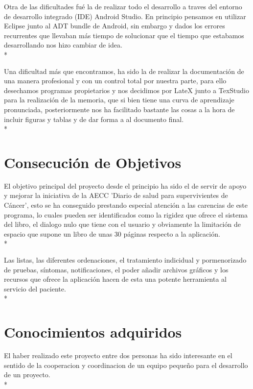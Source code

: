 \documentclass[../pfc.tex]{subfiles}
\begin{document}
	Otra de las dificultades fué la de realizar todo el desarrollo a traves del entorno de desarrollo integrado (IDE) Android Studio. En principio pensamos en utilizar Eclipse junto al ADT bundle de Android, sin embargo y dados los errores recurrentes que llevaban más tiempo de solucionar que el tiempo que estabamos desarrollando nos hizo cambiar de idea.\\*
	 
	Una dificultad más que encontramos, ha sido la de realizar la documentación de una manera profesional y con un control total por nuestra parte, para ello desechamos programas propietarios y nos decidimos por LateX\cite{sharelatex} junto a TexStudio\cite{texstudio} para la realización de la memoria, que si bien tiene una curva de aprendizaje pronunciada, posteriormente nos ha facilitado bastante las cosas a la hora de incluir figuras y tablas y de dar forma a al documento final.\\*
	
		
	\section{Consecución de Objetivos}
	
	El objetivo principal del proyecto desde el principio ha sido el de servir de apoyo y mejorar la iniciativa de la AECC 'Diario de salud para supervivientes de Cáncer', esto se ha conseguido prestando especial atención a las carencias de este programa, lo cuales pueden ser identificados como la rigidez que ofrece el sistema del libro, el dialogo nulo que tiene con el usuario y obviamente la limitación de espacio que supone un libro de unas 30 páginas respecto a la aplicación.\\*
	
	Las listas, las diferentes ordenaciones, el tratamiento indicidual y pormenorizado de pruebas, síntomas, notificaciones, el poder añadir archivos gráficos y los recursos que ofrece la aplicación hacen de esta una potente herramienta al servicio del paciente.\\*
		
	
	\section{Conocimientos adquiridos}
	
	El haber realizado este proyecto entre dos personas ha sido interesante en el sentido de la cooperacion y coordinacion de un equipo pequeño para el desarrollo de un proyecto.\\*
	
\end{document}
